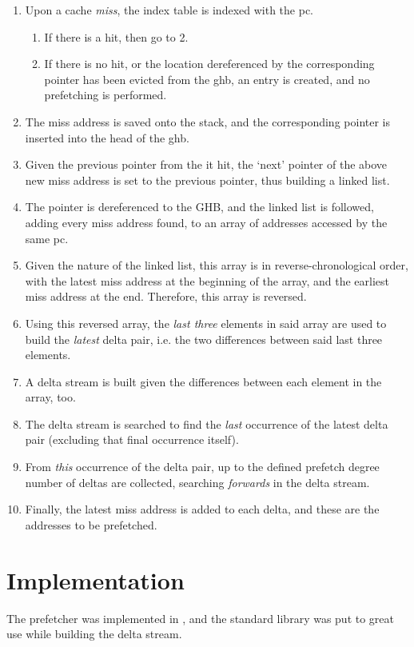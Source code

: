 \documentclass[multicol,date,tikzlibs,minted,ieeebib,bibtex]{epreport}
\begin{document}
\begin{multicols}{2}
	\begin{enumerate}
		\item Upon a cache \emph{miss}, the index table is indexed with the \gls{pc}.
		      \begin{enumerate}
			      \item If there is a hit, then go to 2.
			      \item If there is no hit, or the location dereferenced by the corresponding pointer has been evicted from the \gls{ghb}, an entry is created, and no prefetching is performed.
		      \end{enumerate}
		\item The miss address is saved onto the stack, and the corresponding pointer is inserted into the head of the \gls{ghb}.
		\item Given the previous pointer from the \gls{it} hit, the `next' pointer of the above new miss address is set to the previous pointer, thus building a linked list.
		\item The pointer is dereferenced to the GHB, and the linked list is followed, adding every miss address found, to an array of addresses accessed by the same \gls{pc}.
		\item Given the nature of the linked list, this array is in reverse-chronological order, with the latest miss address at the beginning of the array, and the earliest miss address at the end. Therefore, this array is reversed.
		\item Using this reversed array, the \emph{last three} elements in said array are used to build the \emph{latest} delta pair, i.e. the two differences between said last three elements.
		\item A delta stream is built given the differences between each element in the array, too.
		\item The delta stream is searched to find the \emph{last} occurrence of the latest delta pair (excluding that final occurrence itself).
		\item From \emph{this} occurrence of the delta pair, up to the defined prefetch degree number of deltas are collected, searching \emph{forwards} in the delta stream.
		\item Finally, the latest miss address is added to each delta, and these are the addresses to be prefetched.
	\end{enumerate}

	\section{Implementation}
	The prefetcher was implemented in , and the standard library was put to great use while building the delta stream.


\end{multicols}
\end{document}
